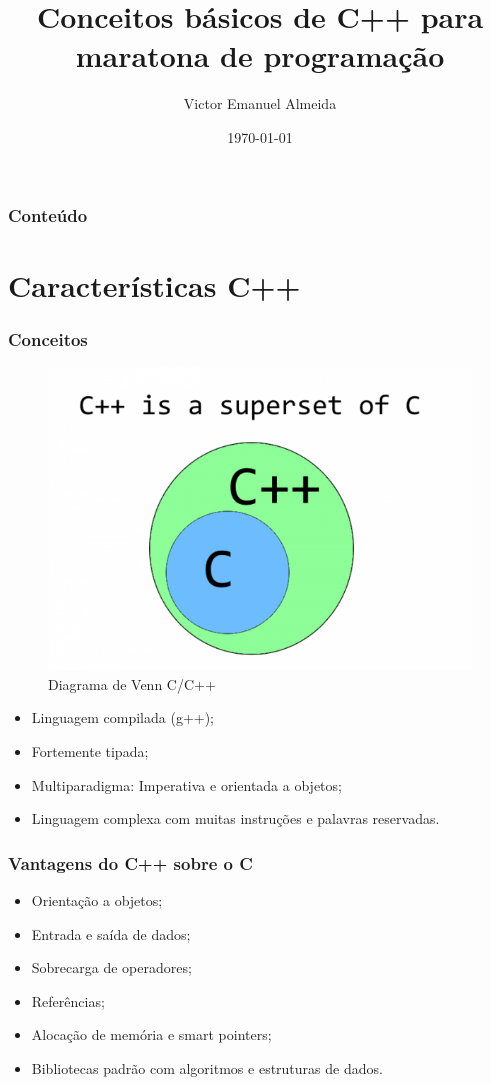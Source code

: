 \documentclass[12pt]{beamer}
\author{Victor Emanuel Almeida}
\title{Conceitos básicos de C++ para maratona de programação}
\date{\today}
\institute{UNIOESTE}
\begin{document}
\frame{\titlepage}

\begin{frame}
    \frametitle{Conteúdo}
    \tableofcontents
\end{frame}

\section{Características C++}\label{Características C++}
\begin{frame}[allowframebreaks]
    \frametitle{Conceitos}
    \begin{figure}[!htb]
        \centering
        \includegraphics[width=.7\textwidth]{superset}
        \caption{\label{fig:superset}Diagrama de Venn C/C++}
    \end{figure}
    \framebreak
    \begin{itemize}
        \item Linguagem compilada (g++);
        \item Fortemente tipada\cite{slides_clp_2};
        \item Multiparadigma: Imperativa e orientada a objetos\cite{slides_clp_2};
        \item Linguagem complexa com muitas instruções e palavras reservadas\cite{slides_clp_2}.
    \end{itemize}
\end{frame}

\begin{frame}
    \frametitle{Vantagens do C++ sobre o C}
    \begin{itemize}
        \item Orientação a objetos;
        \item Entrada e saída de dados;
        \item Sobrecarga de operadores;
        \item Referências;
        \item Alocação de memória e smart pointers;
        \item Bibliotecas padrão com algoritmos e estruturas de dados.
    \end{itemize}
\end{frame}
\end{document}
